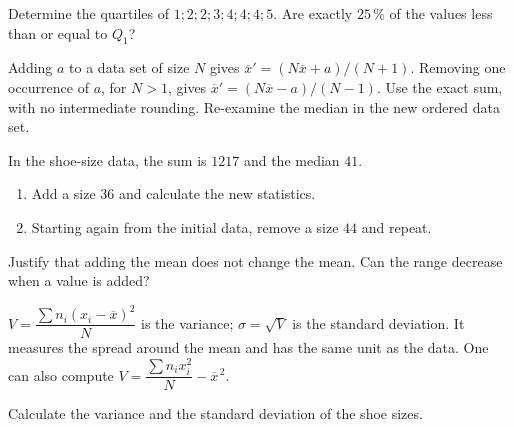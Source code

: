 \begin{example}Determine the quartiles of $1;2;2;3;4;4;4;5$. Are exactly $25\,\%$ of the values less than or equal to $Q_1$?\end{example}
\begin{keypoint}[Properties]
Adding $a$ to a data set of size $N$ gives $\overline x'=(N\overline x+a)/(N+1)$.
Removing one occurrence of $a$, for $N>1$, gives $\overline x'=(N\overline x-a)/(N-1)$. Use the exact sum, with no intermediate rounding. Re-examine the median in the new ordered data set.
\end{keypoint}
\begin{example}In the shoe-size data, the sum is $1217$ and the median $41$.
\begin{enumerate}\item Add a size $36$ and calculate the new statistics.\item Starting again from the initial data, remove a size $44$ and repeat.\end{enumerate}\end{example}
\begin{example}Justify that adding the mean does not change the mean. Can the range decrease when a value is added?\end{example}
\begin{keypoint}[Definitions]
$V=\dfrac{\sum n_i(x_i-\overline x)^2}{N}$ is the variance; $\sigma=\sqrt V$ is the standard deviation. It measures the spread around the mean and has the same unit as the data. One can also compute $V=\dfrac{\sum n_ix_i^2}{N}-\overline x^{\,2}$.
\end{keypoint}
\begin{example}Calculate the variance and the standard deviation of the shoe sizes.\end{example}
